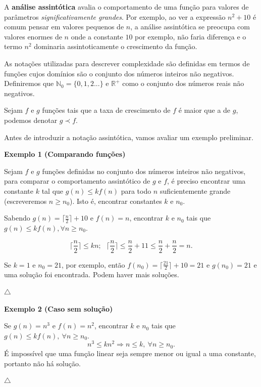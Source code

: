 A \textbf{análise assintótica} avalia o comportamento de uma função para valores de parâmetros \textit{significativamente grandes}. Por exemplo, ao ver a expressão $n^2+10$ é comum pensar em valores pequenos de $n$, a análise assintótica se preocupa com valores enormes de $n$ onde a constante $10$ por exemplo, não faria diferença e o termo $n^2$ dominaria assintoticamente o crescimento da função.

As notações utilizadas para descrever complexidade são definidas em termos de funções cujos domínios são o conjunto dos números inteiros não negativos. Definiremos que $\mathbb{N}_0 = \{0,1,2...\}$ e $\mathbb{R}^{+}$ como o conjunto dos números reais não negativos.

Sejam $f$ e $g$ funções tais que a taxa de crescimento de $f$ é maior que a de $g$, podemos denotar $g\prec f$.

Antes de introduzir a notação assintótica, vamos avaliar um exemplo preliminar.

\textbf{Exemplo 1 (Comparando funções)}

Sejam $f$ e $g$ funções definidas no conjunto dos números inteiros não negativos, para comparar o comportamento assintótico de $g$ e $f$, é preciso encontrar uma constante $k$ tal que $g(n)\leq kf(n)$ para todo $n$ suficientemente grande (escreveremos $n\geq n_0$). Isto é, encontrar constantes $k$ e $n_0$.

Sabendo $g(n)=\lceil\frac{n}{2}\rceil+10$ e $f(n)=n$, encontrar $k$ e $n_0$ tais que $g(n)\leq kf(n), \forall n\geq n_0$.

\[\Bigr\lceil \frac{n}{2} \Bigr\rceil \leq kn; \ \ \ \Bigr\lceil \frac{n}{2} \Bigr\rceil \leq \frac{n}{2} + 11 \leq \frac{n}{2} + \frac{n}{2} = n.\]

Se $k=1$ e $n_0=21$, por exemplo, então $f(n_0)=\lceil\frac{21}{2}\rceil+10 = 21$ e $g(n_0)=21$ e uma solução foi encontrada. Podem haver mais soluções.

{\raggedleft $\bigtriangleup$ \par}

\textbf{Exemplo 2 (Caso sem solução)}

Se $g(n)=n^3$ e $f(n)=n^2$, encontrar $k$ e $n_0$ tais que $g(n)\leq kf(n), \ \forall n\geq n_0$.
\[n^3\leq kn^2 \Rightarrow n\leq k, \ \forall n\geq n_0. \]
É impossível que uma função linear seja sempre menor ou igual a uma constante, portanto não há solução.

{\raggedleft $\bigtriangleup$ \par}

